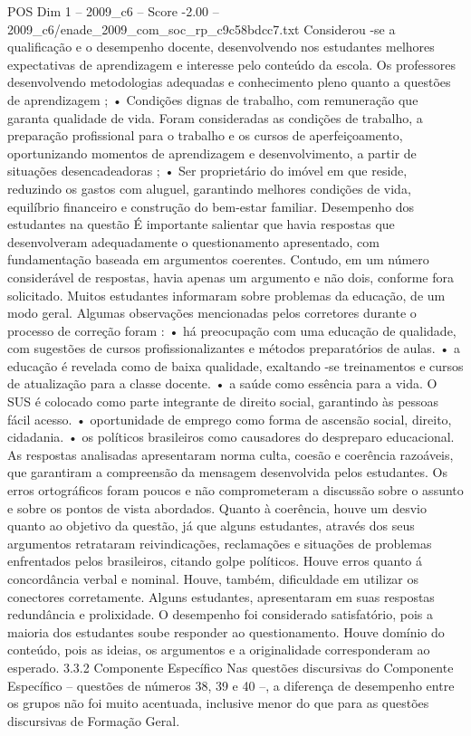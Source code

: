 \begin{textsample}{POS Dim 1 – 2009\_c6 – Score -2.00 – 2009\_c6/enade\_2009\_com\_soc\_rp\_c9c58bdcc7.txt}
Considerou -se a qualificação e o desempenho docente, desenvolvendo nos estudantes melhores expectativas de aprendizagem e interesse pelo conteúdo da escola.
Os professores desenvolvendo metodologias adequadas e conhecimento pleno quanto a questões de aprendizagem ; • Condições dignas de trabalho, com remuneração que garanta qualidade de vida.
Foram consideradas as condições de trabalho, a preparação profissional para o trabalho e os cursos de aperfeiçoamento, oportunizando momentos de aprendizagem e desenvolvimento, a partir de situações desencadeadoras ; • Ser proprietário do imóvel em que reside, reduzindo os gastos com aluguel, garantindo melhores condições de vida, equilíbrio financeiro e construção do bem-estar familiar.
Desempenho dos estudantes na questão É importante salientar que havia respostas que desenvolveram adequadamente o questionamento apresentado, com fundamentação baseada em argumentos coerentes.
Contudo, em um número considerável de respostas, havia apenas um argumento e não dois, conforme fora solicitado.
Muitos estudantes informaram sobre problemas da educação, de um modo geral.
Algumas observações mencionadas pelos corretores durante o processo de correção foram : • há preocupação com uma educação de qualidade, com sugestões de cursos profissionalizantes e métodos preparatórios de aulas. • a educação é revelada como de baixa qualidade, exaltando -se treinamentos e cursos de atualização para a classe docente. • a saúde como essência para a vida.
O SUS é colocado como parte integrante de direito social, garantindo às pessoas fácil acesso. • oportunidade de emprego como forma de ascensão social, direito, cidadania. • os políticos brasileiros como causadores do despreparo educacional.
As respostas analisadas apresentaram norma culta, coesão e coerência razoáveis, que garantiram a compreensão da mensagem desenvolvida pelos estudantes.
Os erros ortográficos foram poucos e não comprometeram a discussão sobre o assunto e sobre os pontos de vista abordados.
Quanto à coerência, houve um desvio quanto ao objetivo da questão, já que alguns estudantes, através dos seus argumentos retrataram reivindicações, reclamações e situações de problemas enfrentados pelos brasileiros, citando golpe políticos.
Houve erros quanto á concordância verbal e nominal.
Houve, também, dificuldade em utilizar os conectores corretamente.
Alguns estudantes, apresentaram em suas respostas redundância e prolixidade.
O desempenho foi considerado satisfatório, pois a maioria dos estudantes soube responder ao questionamento.
Houve domínio do conteúdo, pois as ideias, os argumentos e a originalidade corresponderam ao esperado. 3.3.2 Componente Específico Nas questões discursivas do Componente Específico – questões de números 38, 39 e 40 –, a diferença de desempenho entre os grupos não foi muito acentuada, inclusive menor do que para as questões discursivas de Formação Geral.

\end{textsample}
